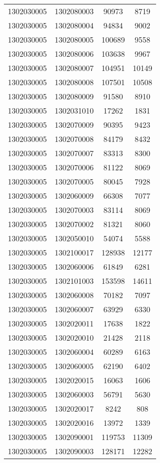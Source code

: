\begin{longtable}[h]{llcc}
		1302030005 & 1302080003 & 90973 & 8719\\
		1302030005 & 1302080004 & 94834 & 9002\\
		1302030005 & 1302080005 & 100689 & 9558\\
		1302030005 & 1302080006 & 103638 & 9967\\
		1302030005 & 1302080007 & 104951 & 10149\\
		1302030005 & 1302080008 & 107501 & 10508\\
		1302030005 & 1302080009 & 91580 & 8910\\
		1302030005 & 1302031010 & 17262 & 1831\\
		1302030005 & 1302070009 & 90395 & 9423\\
		1302030005 & 1302070008 & 84179 & 8432\\
		1302030005 & 1302070007 & 83313 & 8300\\
		1302030005 & 1302070006 & 81122 & 8069\\
		1302030005 & 1302070005 & 80045 & 7928\\
		1302030005 & 1302060009 & 66308 & 7077\\
		1302030005 & 1302070003 & 83114 & 8069\\
		1302030005 & 1302070002 & 81321 & 8060\\
		1302030005 & 1302050010 & 54074 & 5588\\
		1302030005 & 1302100017 & 128938 & 12177\\
		1302030005 & 1302060006 & 61849 & 6281\\
		1302030005 & 1302101003 & 153598 & 14611\\
		1302030005 & 1302060008 & 70182 & 7097\\
		1302030005 & 1302060007 & 63929 & 6330\\
		1302030005 & 1302020011 & 17638 & 1822\\
		1302030005 & 1302020010 & 21428 & 2118\\
		1302030005 & 1302060004 & 60289 & 6163\\
		1302030005 & 1302060005 & 62190 & 6402\\
		1302030005 & 1302020015 & 16063 & 1606\\
		1302030005 & 1302060003 & 56791 & 5630\\
		1302030005 & 1302020017 & 8242 & 808\\
		1302030005 & 1302020016 & 13972 & 1339\\
		1302030005 & 1302090001 & 119753 & 11309\\
		1302030005 & 1302090003 & 128171 & 12282\\

\end{longtable}
